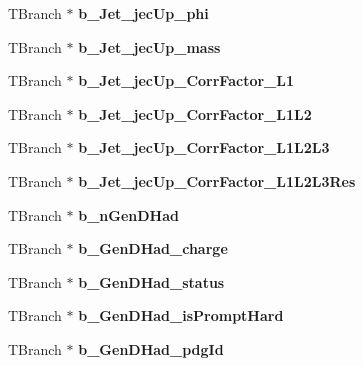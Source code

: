 \begin{DoxyCompactItemize}
T\+Branch $\ast$ {\bfseries b\+\_\+\+Jet\+\_\+jec\+Up\+\_\+phi}
\item 
\hypertarget{classMiniTree_af1ff6789f5dd3ae3cb00212371b38004}{}\label{classMiniTree_af1ff6789f5dd3ae3cb00212371b38004} 
T\+Branch $\ast$ {\bfseries b\+\_\+\+Jet\+\_\+jec\+Up\+\_\+mass}
\item 
\hypertarget{classMiniTree_a4397d932f4ad465b60d54b8cc3e7c47c}{}\label{classMiniTree_a4397d932f4ad465b60d54b8cc3e7c47c} 
T\+Branch $\ast$ {\bfseries b\+\_\+\+Jet\+\_\+jec\+Up\+\_\+\+Corr\+Factor\+\_\+\+L1}
\item 
\hypertarget{classMiniTree_a771f4604e9411920248bb2c5412de104}{}\label{classMiniTree_a771f4604e9411920248bb2c5412de104} 
T\+Branch $\ast$ {\bfseries b\+\_\+\+Jet\+\_\+jec\+Up\+\_\+\+Corr\+Factor\+\_\+\+L1\+L2}
\item 
\hypertarget{classMiniTree_a42576e8d3ed1877d619ad9a7412e5a34}{}\label{classMiniTree_a42576e8d3ed1877d619ad9a7412e5a34} 
T\+Branch $\ast$ {\bfseries b\+\_\+\+Jet\+\_\+jec\+Up\+\_\+\+Corr\+Factor\+\_\+\+L1\+L2\+L3}
\item 
\hypertarget{classMiniTree_a053fdc744f6e783d0e029b8a0ca0bca9}{}\label{classMiniTree_a053fdc744f6e783d0e029b8a0ca0bca9} 
T\+Branch $\ast$ {\bfseries b\+\_\+\+Jet\+\_\+jec\+Up\+\_\+\+Corr\+Factor\+\_\+\+L1\+L2\+L3\+Res}
\item 
\hypertarget{classMiniTree_a25dee5bba1b79ddccfbce95e0c366077}{}\label{classMiniTree_a25dee5bba1b79ddccfbce95e0c366077} 
T\+Branch $\ast$ {\bfseries b\+\_\+n\+Gen\+D\+Had}
\item 
\hypertarget{classMiniTree_adacb64f15aaf380673b8f653f4118f68}{}\label{classMiniTree_adacb64f15aaf380673b8f653f4118f68} 
T\+Branch $\ast$ {\bfseries b\+\_\+\+Gen\+D\+Had\+\_\+charge}
\item 
\hypertarget{classMiniTree_a5d2613b32812cf256037e79982d53036}{}\label{classMiniTree_a5d2613b32812cf256037e79982d53036} 
T\+Branch $\ast$ {\bfseries b\+\_\+\+Gen\+D\+Had\+\_\+status}
\item 
\hypertarget{classMiniTree_a1b91b4e4293e285a14a9d79365bb4d95}{}\label{classMiniTree_a1b91b4e4293e285a14a9d79365bb4d95} 
T\+Branch $\ast$ {\bfseries b\+\_\+\+Gen\+D\+Had\+\_\+is\+Prompt\+Hard}
\item 
\hypertarget{classMiniTree_a6dfa5cee6323ae79eb4fbb8994dbc8db}{}\label{classMiniTree_a6dfa5cee6323ae79eb4fbb8994dbc8db} 
T\+Branch $\ast$ {\bfseries b\+\_\+\+Gen\+D\+Had\+\_\+pdg\+Id}
\item 
\hypertarget{classMiniTree_ad510fa5234ddb57162c8042eba20b993}{}\label{classMiniTree_ad510fa5234ddb57162c8042eba20b993} 

\end{DoxyCompactItemize}
